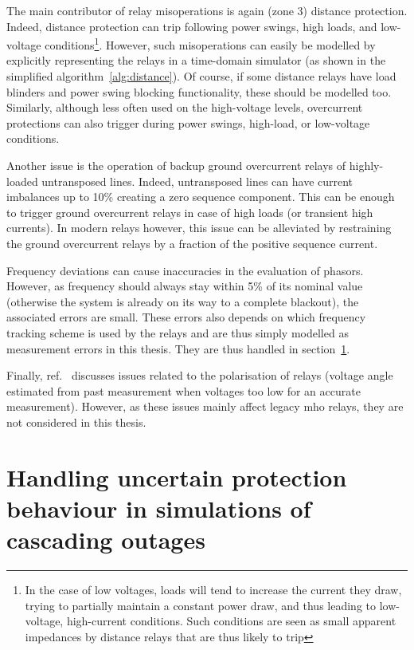 The main contributor of relay misoperations is again (zone 3) distance protection. Indeed, distance protection can trip following power swings, high loads, and low-voltage conditions\footnote{In the case of low voltages, loads will tend to increase the current they draw, trying to partially maintain a constant power draw, and thus leading to low-voltage, high-current conditions. Such conditions are seen as small apparent impedances by distance relays that are thus likely to trip}. However, such misoperations can easily be modelled by explicitly representing the relays in a time-domain simulator (as shown in the simplified algorithm~\ref{alg:distance}). Of course, if some distance relays have load blinders and power swing blocking functionality, these should be modelled too. Similarly, although less often used on the high-voltage levels, overcurrent protections can also trigger during power swings, high-load, or low-voltage conditions.

Another issue is the operation of backup ground overcurrent relays of highly-loaded untransposed lines. Indeed, untransposed lines can have current imbalances up to 10\% creating a zero sequence component. This can be enough to trigger ground overcurrent relays in case of high loads (or transient high currents). In modern relays however, this issue can be alleviated by restraining the ground overcurrent relays by a fraction of the positive sequence current.

Frequency deviations can cause inaccuracies in the evaluation of phasors. However, as frequency should always stay within 5\% of its nominal value (otherwise the system is already on its way to a complete blackout), the associated errors are small. These errors also depends on which frequency tracking scheme is used by the relays and are thus simply modelled as measurement errors in this thesis. They are thus handled in section~\ref{sec:protection_uncertainty}.

Finally, ref.~\cite{ProtectionFailuresDemetrios, PSRCreportProtectionMisop, PSRCreportSummaryProtectionMisop} discusses issues related to the polarisation of relays (voltage angle estimated from past measurement when voltages too low for an accurate measurement). However, as these issues mainly affect legacy mho relays, they are not considered in this thesis.



\section{Handling uncertain protection behaviour in simulations of cascading outages}
\label{sec:protection_uncertainty}

